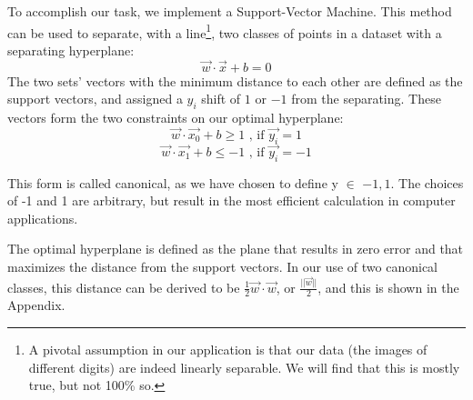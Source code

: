 %
%

To accomplish our task, we implement a Support-Vector Machine. This method can be used to separate, with a line\footnote{A pivotal assumption in our application is that our data (the images of different digits) are indeed linearly separable. We will find that this is mostly true, but not 100\% so.}, two classes of points in a dataset with a separating hyperplane:
\begin{equation}
\vec{w}\cdot\vec{x} + b = 0
\end{equation}
The two sets' vectors with the minimum distance to each other are defined as the support vectors, and assigned a $y_{i}$ shift of $1$ or $-1$ from the separating. These vectors form the two constraints on our optimal hyperplane:
\begin{equation}
\vec{w}\cdot\vec{x_0} + b \geq 1 \text{ , if } \vec{y_i} = 1
\end{equation}
\begin{equation}
\vec{w}\cdot\vec{x_1} + b \leq -1 \text{ , if } \vec{y_i} = -1
\end{equation}

This form is called canonical, as we have chosen to define y $\in$ ${-1, 1}$. The choices of -1 and 1 are arbitrary, but result in the most efficient calculation in computer applications.

The optimal hyperplane is defined as the plane that results in zero error and that maximizes the distance from the support vectors. In our use of two canonical classes, this distance can be derived to be $\frac{1}{2}\vec{w}\cdot\vec{w}$, or $\frac{||\vec{w}||}{2}$, and this is shown in the Appendix.

